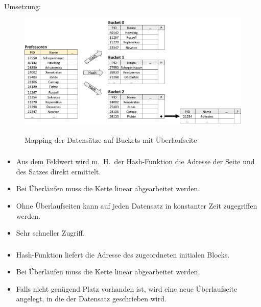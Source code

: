 \begin{frame}
\frametitle{\insertsection}
\framesubtitle{\insertsubsection}
\\[4pt]
Umsetzung: 
\begin{figure}
\includegraphics[scale=0.35, trim=0 0 0 4cm]{img/Hash-Bucket-3.png}
\\[-8pt]\caption{Mapping der Datens\"atze auf Buckets mit \"Uberlaufseite}
\end{figure}
\end{frame}

\begin{frame}
\frametitle{\insertsection}
\framesubtitle{\insertsubsection}
\begin{itemize}
	\item Aus dem Feldwert wird m.~H.~der Hash-Funktion die Adresse der Seite und des Satzes direkt ermittelt. 
	\item Bei \"Uberl\"aufen muss die Kette linear abgearbeitet werden. 
	\item Ohne \"Uberlaufseiten kann auf jeden Datensatz in konstanter Zeit zugegriffen werden.
	\item Sehr schneller Zugriff.	
\end{itemize}
\end{frame}

\begin{frame}
\frametitle{\insertsection}
\framesubtitle{\insertsubsection}
\begin{itemize}
	\item Hash-Funktion liefert die Adresse des zugeordneten initialen Blocks.
	\item Bei \"Uberl\"aufen muss die Kette linear abgearbeitet werden. 
	\item Falls nicht gen\"ugend Platz vorhanden ist, wird eine neue \"Uberlaufseite angelegt, in die der Datensatz geschrieben wird.
\end{itemize}
\end{frame}

